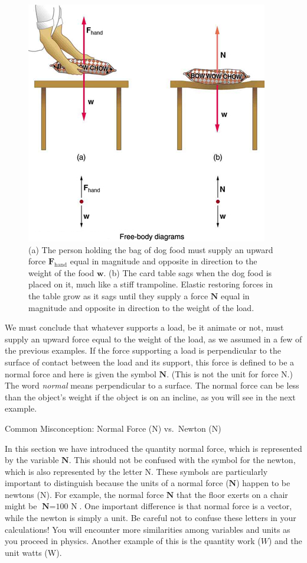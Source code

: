 \documentclass[
]{book}
\begin{document}
\begin{figure}
\hypertarget{import-auto-id2672874}{%
\centering
\includegraphics{images/Figure_04_05_01.jpg}
\caption{(a) The person holding the bag of dog food must supply an upward force
\(\textbf{F}_{\text{hand}}{}\) equal in magnitude and opposite in
direction to the weight of the food \(\textbf{w}{}\). (b) The card table
sags when the dog food is placed on it, much like a stiff trampoline.
Elastic restoring forces in the table grow as it sags until they supply
a force \(\textbf{N}{}\) equal in magnitude and opposite in direction to
the weight of the
load.}\label{import-auto-id2672874}
}
\end{figure}

We must conclude that whatever supports a load, be it animate or not,
must supply an upward force equal to the weight of the load, as we
assumed in a few of the previous examples. If the force supporting a
load is perpendicular to the surface of contact between the load and its
support, this force is defined to be a \protect\hypertarget{import-auto-id1254224}{}{normal
force}\textbf{} and here is given
the symbol \(\textbf{N}{}\). (This is not the unit for force N.) The word
\emph{normal} means perpendicular to a surface.
The normal force can be less than the object's weight if the object is
on an incline, as you will see in the next example.

\hypertarget{fs-id2016495}{}
Common Misconception: Normal Force (N) vs.~Newton (N)

In this section we have introduced the quantity normal force, which is
represented by the variable \(\textbf{N}{}\). This should not be confused
with the symbol for the newton, which is also represented by the letter
N. These symbols are particularly important to distinguish because the
units of a normal force (\(\textbf{N}{}\)) happen to be newtons (N). For
example, the normal force \(\textbf{N}{}\) that the floor exerts on a
chair might be \({\textbf{N} = \text{100\ N}}{}\). One important
difference is that normal force is a vector, while the newton is simply
a unit. Be careful not to confuse these letters in your calculations!
You will encounter more similarities among variables and units as you
proceed in physics. Another example of this is the quantity work (\(W{}\))
and the unit watts (W).
\end{document}
